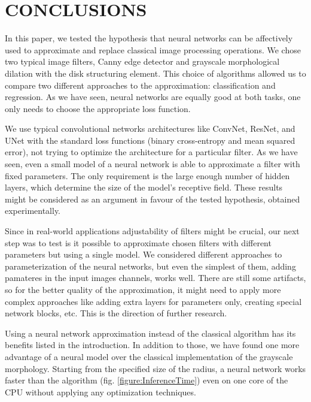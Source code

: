 \section*{\textbf{CONCLUSIONS}}

In this paper, we tested the hypothesis that neural networks can be affectively used to approximate and replace classical image processing operations. We chose two typical image filters, Canny edge detector and grayscale morphological dilation with the disk structuring element. This choice of algorithms allowed us to compare two different approaches to the approximation: classification and regression. As we have seen, neural networks are equally good at both tasks, one only needs to choose the appropriate loss function. 

We use typical convolutional networks architectures like ConvNet, ResNet, and UNet with the standard loss functions (binary cross-entropy and mean squared error), not trying to optimize the architecture for a particular filter. As we have seen, even a small model of a neural network is able to approximate a filter with fixed parameters. The only requirement is the large enough number of hidden layers, which determine the size of the model's receptive field. These results might be considered as an argument in favour of the tested hypothesis, obtained experimentally. 

Since in real-world applications adjustability of filters might be crucial, our next step was to test is it possible to approximate chosen filters with different parameters but using a single model. We considered different approaches to parameterization of the neural networks, but even the simplest of them, adding pamateres in the input images channels, works well. There are still some artifacts, so for the better quality of the approximation, it might need to apply more complex approaches like adding extra layers for parameters only, creating special network blocks, etc. This is the direction of further research.

Using a neural network approximation instead of the classical algorithm has its benefits listed in the introduction. In addition to those, we have found one more advantage of a neural model over the classical implementation of the grayscale morphology. Starting from the specified size of the radius, a neural network works faster than the algorithm (fig. \ref{figure:InferenceTime}) even on one core of the CPU without applying any optimization techniques. 


